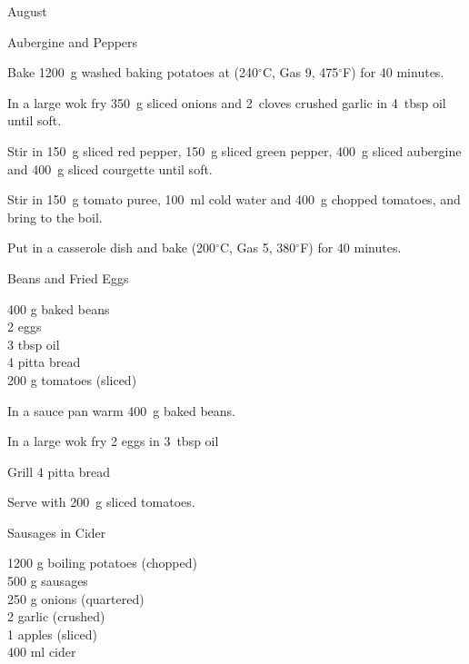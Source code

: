 \begin{menu}{August}
\begin{recipe}{2}{Aubergine and Peppers}
    \begin{instructions}
    \item 
    Bake
    1200~g washed baking potatoes
    at
    (240$^{\circ}$C, Gas 9, 475$^{\circ}$F) for 40 minutes.
  \item 
        In a large wok fry
        350~g sliced onions
        and
        2~cloves crushed garlic
        in
        4~tbsp  oil
        until soft.
      \item 
        Stir in
        150~g sliced red pepper,
        150~g sliced green pepper,
        400~g sliced aubergine
        and
        400~g sliced courgette
        until soft.
      \item 
        Stir in
        150~g  tomato puree,
        100~ml  cold water
        and
        400~g chopped tomatoes,
        and bring to the boil.
      \item 
        Put in a casserole dish and bake (200$^{\circ}$C, Gas 5, 380$^{\circ}$F) for 40 minutes.
      
    \end{instructions}
    \end{recipe}%
  
    \begin{recipe}{1}{Beans and Fried Eggs}%
		\begin{ingredients}
		400 g baked beans  \\
	2  eggs  \\
	3 tbsp oil  \\
	4  pitta bread  \\
	200 g tomatoes (sliced) \\
	
		\end{ingredients}
	
	
    \begin{instructions}
    \item 
        In a sauce pan warm
        400~g  baked beans.
      \item 
        In a large wok fry
        2  eggs
        in
        3~tbsp  oil\item 
        Grill
        4  pitta bread\item 
        Serve with 200~g sliced tomatoes.
      
    \end{instructions}
    \end{recipe}%
  
    \begin{recipe}{2}{Sausages in Cider}%
		\begin{ingredients}
		1200 g boiling potatoes (chopped) \\
	500 g sausages  \\
	250 g onions (quartered) \\
	2  garlic (crushed) \\
	1  apples (sliced) \\
	400 ml cider  \\
	

\end{ingredients}
\end{recipe}
\end{menu}
